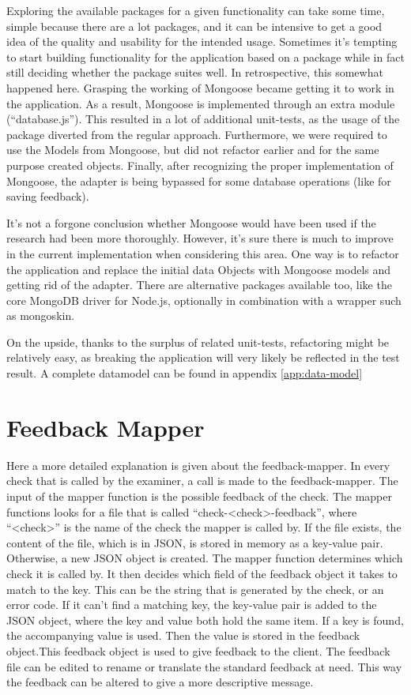 Exploring the available packages for a given functionality can take some time,
simple because there are a lot packages, and it can be intensive to get a good
idea of the quality and usability for the intended usage. Sometimes it's
tempting to start building functionality for the application based on a package
while in fact still deciding whether the package suites well. In retrospective,
this somewhat happened here. Grasping the working of Mongoose became getting it
to work in the application. As a result, Mongoose is implemented through an 
extra module (``database.js''). This resulted in a lot of additional 
unit-tests, as the usage of the package diverted from the regular approach. 
Furthermore, we were required to use the Models from Mongoose, but did not
refactor earlier and for the same purpose created objects. Finally, after 
recognizing the proper implementation of Mongoose, the adapter is being bypassed
for some database operations (like for saving feedback).

It's not a forgone conclusion whether Mongoose would have been used if the
research had been more thoroughly. However, it's sure there is much to improve
in the current implementation when considering this area. One way is to refactor
the application and replace the initial data Objects with Mongoose models and
getting rid of the adapter. There are alternative packages available too, like 
the core MongoDB driver for Node.js, optionally in combination with a wrapper 
such as mongoskin. 

On the upside, thanks to the surplus of related unit-tests, refactoring might be 
relatively easy, as breaking the application will very likely be reflected in 
the test result. A complete datamodel can be found in 
appendix \ref{app:data-model}

\section{Feedback Mapper}
Here a more detailed explanation is given about the feedback-mapper.
In every \gls{check} that is called by the \gls{examiner}, a call is made to the
feedback-mapper.
The input of the mapper function is the possible feedback of the \gls{check}.
The mapper functions looks for a file that is called ``check-<check>-feedback'',
where ``<check>'' is the name of the \gls{check} the mapper is called by.
If the file exists, the content of the file, which is in JSON,
is stored in memory as a key-value pair.
Otherwise, a new JSON object is created.
The mapper function determines which \gls{check} it is called by.
It then decides which field of the feedback object it takes to match to the key.
This can be the string that is generated by the \gls{check}, or an error code. 
If it can't find a matching key, the key-value pair is added to the JSON object,
where the key and value both hold the same item.
If a key is found, the accompanying value is used. Then the value is stored in 
the feedback object.This feedback object is used to give feedback to the client.
The feedback file can be edited to rename or translate the standard feedback at 
need. This way the feedback can be altered to give a more descriptive message.
    

